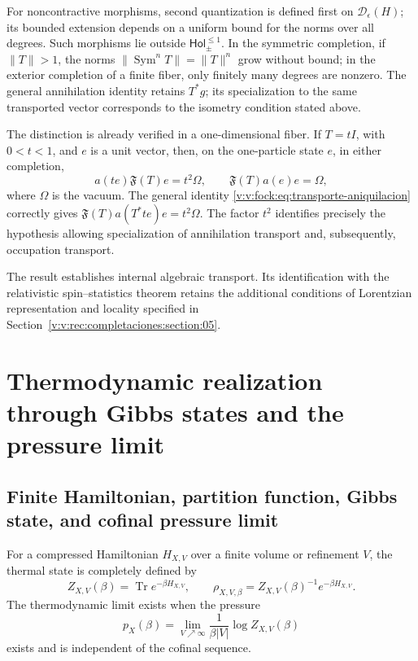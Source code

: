 For noncontractive morphisms, second quantization is defined first
on \(\mathcal D_\epsilon(H)\); its bounded extension depends on a
uniform bound for the norms over all degrees. Such morphisms lie outside
\(\mathsf{Hol}_{\pm}^{\leq1}\). In the symmetric completion, if
\(\|T\|>1\), the norms \(\|\operatorname{Sym}^nT\|=\|T\|^n\)
grow without bound; in the exterior completion of a finite fiber, only
finitely many degrees are nonzero. The general annihilation
identity retains \(T^*g\); its specialization to the same transported
vector corresponds to the isometry condition stated above.

The distinction is already verified in a one-dimensional fiber. If
\(T=tI\), with \(0<t<1\), and \(e\) is a unit vector, then, on the
one-particle state \(e\), in either completion,
\begin{equation}
 a(te)\mathfrak F(T)e=t^2\Omega,
 \qquad \mathfrak F(T)a(e)e=\Omega,
 \label{v:v:fock:eq:control-no-isometrico}
\end{equation}
where \(\Omega\) is the vacuum. The general identity
\eqref{v:v:fock:eq:transporte-aniquilacion} correctly gives
\(\mathfrak F(T)a(T^*te)e=t^2\Omega\). The factor \(t^2\) identifies
precisely the hypothesis allowing specialization of annihilation
transport and, subsequently, occupation transport.

The result establishes internal algebraic transport. Its identification
with the relativistic spin--statistics theorem retains the additional
conditions of Lorentzian representation and locality specified in
Section~\ref{v:v:rec:completaciones:section:05}.

\clearpage
\section{Thermodynamic realization through Gibbs states and the pressure limit}
\label{v:v:rec:fock_gibbs:section:04}

\subsection{Finite Hamiltonian, partition function, Gibbs state, and cofinal pressure limit}
\label{v:v:rec:fock_gibbs:section:05}

For a compressed Hamiltonian \(H_{X,V}\) over a finite volume or refinement
\(V\), the thermal state is completely defined by
\[
 Z_{X,V}(\beta)=\operatorname{Tr}e^{-\beta H_{X,V}},
 \qquad
 \rho_{X,V,\beta}=Z_{X,V}(\beta)^{-1}e^{-\beta H_{X,V}}.
\]
The thermodynamic limit exists when the pressure
\[
 p_X(\beta)=\lim_{V\nearrow\infty}
 \frac1{\beta |V|}\log Z_{X,V}(\beta)
\]
exists and is independent of the cofinal sequence.

